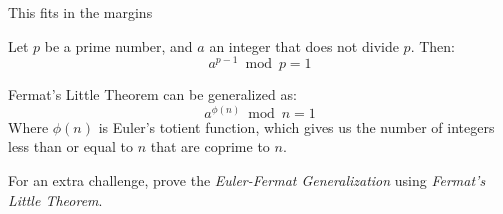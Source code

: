 \begin{namedframe}{This fits in the margins}
	\begin{theorem}
		Let $p$ be a prime number, and $a$ an integer that does not divide $p$.
		\vertspace
		Then:
		\[a^{p-1} \bmod p = 1\]
	\end{theorem}
	\pause
	\begin{theorem}
		Fermat's Little Theorem can be generalized as:
		\[a^{\phi(n)} \bmod n = 1\]
		Where $\phi(n)$ is Euler's totient function, which gives us the number of integers less than or equal to $n$ that are coprime to $n$.
	\end{theorem}
	\pause
	For an extra challenge, prove the \emph{Euler-Fermat Generalization} using \emph{Fermat's Little Theorem}.
\end{namedframe}

